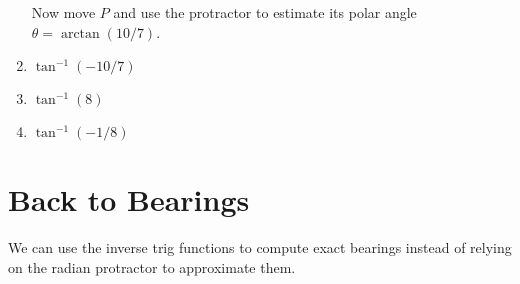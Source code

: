 \documentclass{ximera}
\begin{document}
\begin{question}
\begin{enumerate}
Now move $P$ and use the protractor to estimate its polar angle  $\theta = \arctan(10/7)$. 

\begin{exploration}\label{Exp3:Comp}

 
\begin{onlineOnly}
    \begin{center}
\end{center}
\end{onlineOnly}
\end{exploration}

\item $\tan^{-1}(-10/7)$

\item $\tan^{-1}(8)$

\item $\tan^{-1}(-1/8)$

\end{enumerate}


\end{question}


\section{Back to Bearings}
We can use the inverse trig functions to compute exact bearings instead of relying on the radian protractor to approximate them.
\end{document}
